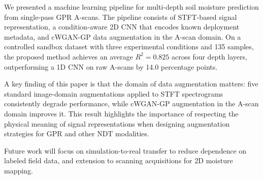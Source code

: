 \documentclass[review]{elsarticle}
\begin{document}
We presented a machine learning pipeline for multi-depth soil moisture prediction from single-pass GPR A-scans. The pipeline consists of STFT-based signal representation, a condition-aware 2D CNN that encodes known deployment metadata, and cWGAN-GP data augmentation in the A-scan domain. On a controlled sandbox dataset with three experimental conditions and 135 samples, the proposed method achieves an average $R^2 = 0.825$ across four depth layers, outperforming a 1D CNN on raw A-scans by 14.0 percentage points.

A key finding of this paper is that the domain of data augmentation matters: five standard image-domain augmentations applied to STFT spectrograms consistently degrade performance, while cWGAN-GP augmentation in the A-scan domain improves it. This result highlights the importance of respecting the physical meaning of signal representations when designing augmentation strategies for GPR and other NDT modalities.

Future work will focus on simulation-to-real transfer to reduce dependence on labeled field data, and extension to scanning acquisitions for 2D moisture mapping.





\end{document}
